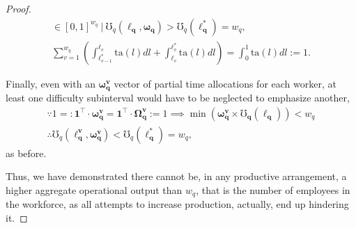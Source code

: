 \documentclass[hidelinks, nonatbib]{elsarticle}
\begin{document}
\begin{lemma}
\begin{proof}
\begin{gather}
            \in
            [0,1]^{w_q}
            \
            \big|
            \
            \mho_{q}(
                \boldsymbol{\ell_q}
                ,\boldsymbol{\omega_q}
            ) 
            >
            \mho_{q}(
                \boldsymbol{\ell_{q}^{*}}
            )
            =
            w_q
            ,
            \\
            \sum_{v=1}^{w_q}
            \left(
                \int_{
                    \ell_{v-1}^{*}
                }^{
                    \ell_{v}
                }
                \text{ta}(l)dl
                +
                \int_{
                    \ell_{v}
                }^{
                    \ell_{v}^{*}
                }
                \text{ta}(l)dl
            \right)
            =
            \int_{0}^{1}
            \text{ta}(l)dl
            :=
            1
            .
        \end{gather}
        
        Finally, even with an $\boldsymbol{\omega_{q}^{v}}$ vector of partial time allocations for each worker, at least one difficulty subinterval would have to be neglected to emphasize another,
        \begin{gather}
            \because
            1 =:
            \boldsymbol{1} ^ \top
            \cdot
            \boldsymbol{\omega_{q}^{v}}
            =
            \boldsymbol{1} ^ \top
            \cdot
            \boldsymbol{\Omega_{q}^{v}}
            := 1
            \implies
            \min\left(
                \boldsymbol{\omega_{q}^{v}}
                \times
                \boldsymbol{\mho_q}(
                    \boldsymbol{\ell_{q}}
                )
            \right)
            <
            w_q
            \\
            \therefore
            \mho_q(
                \boldsymbol{\ell_{q}^{v}},
                \boldsymbol{\omega_{q}^{v}}
            )
            <
            \mho_q(
                \boldsymbol{\ell_{q}^{*}}
            )
            =
            w_q
            ,
        \end{gather}
        as before.
        
        Thus, we have demonstrated there cannot be, in any productive arrangement, a higher aggregate operational output than $w_q$, that is the number of employees in the workforce, as all attempts to increase production, actually, end up hindering it. 
        

\end{proof}
\end{lemma}
\end{document}
